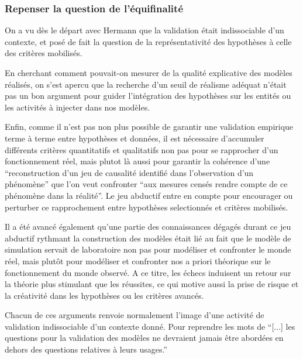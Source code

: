 \subsubsection{Repenser la question de l'équifinalité}

On a vu dès le départ avec Hermann que la validation était indissociable d'un contexte, et posé de fait la question de la représentativité des hypothèses à celle des critères mobilisés. 

En cherchant comment pouvait-on mesurer de la qualité explicative des modèles réalisés, on s'est apercu que la recherche d'un seuil de réalisme adéquat n'était pas un bon argument pour guider l'intégration des hypothèses sur les entités ou les activités à injecter dans nos modèles.%

Enfin, comme il n'est pas non plus possible de garantir une validation empirique terme à terme entre hypothèses et données, il est nécessaire d'accumuler différents critères quantitatifs et qualitatifs non pas pour se rapprocher d'un fonctionnement réel, mais plutot là aussi pour garantir la cohérence d'une \enquote{reconstruction d'un jeu de causalité identifié dans l'observation d'un phénomène} que l'on veut confronter \enquote{aux mesures censés rendre compte de ce phénomène dans la réalité}. Le jeu abductif entre en compte pour encourager ou perturber ce rapprochement entre hypothèses selectionnés et critères mobilisés.

Il a été avancé également qu'une partie des connaissances dégagés durant ce jeu abductif rythmant la construction des modèles était lié au fait que le modèle de simulation servait de laboratoire non pas pour modéliser et confronter le monde réel, mais plutôt pour modéliser et confronter nos a priori théorique sur le fonctionnement du monde observé. A ce titre, les échecs induisent un retour sur la théorie plus stimulant que les réussites, ce qui motive aussi la prise de risque et la créativité dans les hypothèses ou les critères avancés.

Chacun de ces arguments renvoie normalement l'image d'une activité de validation indissociable d'un contexte donné. Pour reprendre les mots de \textcite{Amblard2006} \enquote{[...] les questions pour la validation des modèles ne devraient jamais être abordées en dehors des questions relatives à leurs usages.} 

